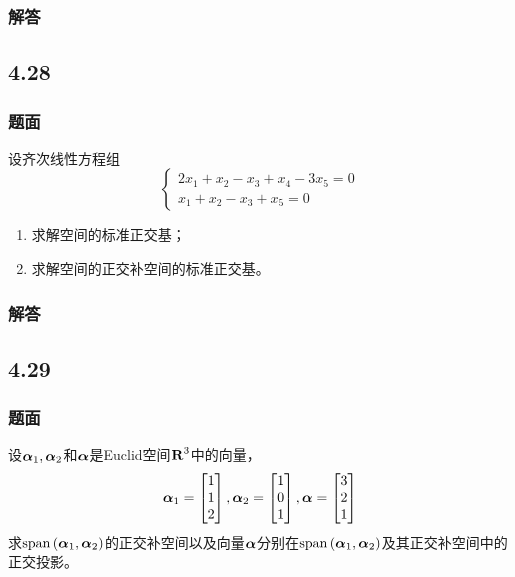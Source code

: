 \documentclass{beamer}
\begin{document}
\begin{frame}
    \frametitle{解答}



\end{frame}

\subsection*{4.28}
\begin{frame}
    \frametitle{题面}

    设齐次线性方程组
    \begin{equation*}
        \begin{cases}
            2x_1+x_2-x_3+x_4-3x_5=0 \\
            x_1+x_2-x_3+x_5=0
        \end{cases}
    \end{equation*}
    \begin{enumerate}
        \item 求解空间的标准正交基；
        \item 求解空间的正交补空间的标准正交基。
    \end{enumerate}

\end{frame}

\begin{frame}
    \frametitle{解答}



\end{frame}

\subsection*{4.29}
\begin{frame}
    \frametitle{题面}

    设\(\boldsymbol{\alpha}_1,\boldsymbol{\alpha}_2\)和\(\boldsymbol{\alpha}\)是Euclid空间\(\boldsymbol{\mathrm{R}}^3\)中的向量，
    \begin{equation*}
        \boldsymbol{\alpha}_1=\begin{bmatrix}1\\1\\2\end{bmatrix},
        \boldsymbol{\alpha}_2=\begin{bmatrix}1\\0\\1\end{bmatrix},
        \boldsymbol{\alpha}=\begin{bmatrix}3\\2\\1\end{bmatrix}
    \end{equation*}
    求\(\mathrm{span}\left( \boldsymbol{\alpha}_1,\boldsymbol{\alpha}_2 \right)\)的正交补空间以及向量\(\boldsymbol{\alpha}\)分别在\(\mathrm{span}\left( \boldsymbol{\alpha}_1,\boldsymbol{\alpha}_2 \right)\)及其正交补空间中的正交投影。

\end{frame}
\end{document}
